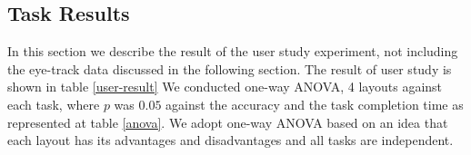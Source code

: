 \documentclass{llncs}
\begin{document}


\subsection{Task Results}

In this section we describe the result of the user study experiment, not including the eye-track data discussed in the following section.
The result of user study is shown in table \ref{user-result} We conducted one-way ANOVA, 4 layouts against each task, where $p$ was $0.05$ against the accuracy and the task completion time as represented at table \ref{anova}.
We adopt one-way ANOVA based on an idea that each layout has its advantages and disadvantages and all tasks are independent.
\end{document}
